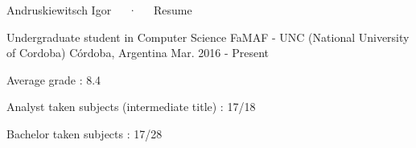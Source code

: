 \documentclass[11pt, a4paper]{resume}
\begin{document}
\makecvheader[R]

\makecvfooter
  { }
  {Andruskiewitsch Igor~~~·~~~Resume}
  {\thepage}



\begin{cventries}

  \cventry
    {Undergraduate student in Computer Science}
    {FaMAF - UNC (National University of Cordoba)}
    {Córdoba, Argentina}
    {Mar. 2016 - Present}
    {
      \begin{cvitems}
        \item {Average grade : 8.4}
        \item {Analyst taken subjects (intermediate title) : 17/18 }
        \item {Bachelor taken subjects : 17/28 }
      \end{cvitems}
    }

\end{cventries}



\end{document}
